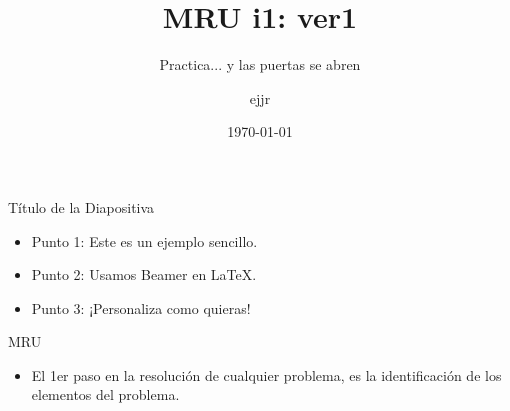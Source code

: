 \documentclass{beamer}
\title{MRU i1: ver1}
\subtitle{Practica... y las puertas se abren}
\author{ejjr}
\date{\today}
\begin{document}
\begin{frame}
    \titlepage
\end{frame}

\begin{frame}{Título de la Diapositiva}
    \begin{itemize}
        \item Punto 1: Este es un ejemplo sencillo.
        \item Punto 2: Usamos Beamer en LaTeX.
        \item Punto 3: ¡Personaliza como quieras!
    \end{itemize}
\end{frame}



\begin{frame}{MRU}
% 
 


 
\begin{itemize}                                                              

\item El 1er paso en la resoluci\'on de cualquier problema, es la
identificaci\'on de los elementos del problema.            
              
\end{itemize}

\end{frame}
\end{document}
